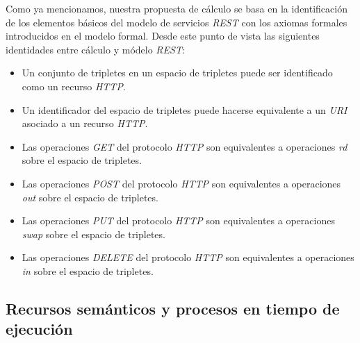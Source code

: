 Como ya mencionamos, nuestra propuesta de c\'alculo se basa en la identificaci\'on de los elementos b\'asicos del modelo de servicios \textit{REST} con los axiomas formales introducidos en el modelo formal. Desde este punto de vista las siguientes identidades entre c\'alculo y m\'odelo \textit{REST}:

\begin{itemize}

\item Un conjunto de tripletes en un espacio de tripletes puede ser identificado como un recurso \textit{HTTP}.
\item Un identificador del espacio de tripletes puede hacerse equivalente a un \textit{URI} asociado a un recurso \textit{HTTP}.
\item Las operaciones \textit{GET} del protocolo \textit{HTTP} son equivalentes a operaciones \textit{rd} sobre el espacio de tripletes.
\item Las operaciones \textit{POST} del protocolo \textit{HTTP} son equivalentes a operaciones \textit{out} sobre el espacio de tripletes.
\item Las operaciones \textit{PUT} del protocolo \textit{HTTP} son equivalentes a operaciones \textit{swap} sobre el espacio de tripletes.
\item Las operaciones \textit{DELETE} del protocolo \textit{HTTP} son equivalentes a operaciones \textit{in} sobre el espacio de tripletes.

\end{itemize}

\subsection{Recursos sem\'anticos y procesos en tiempo de ejecuci\'on}


